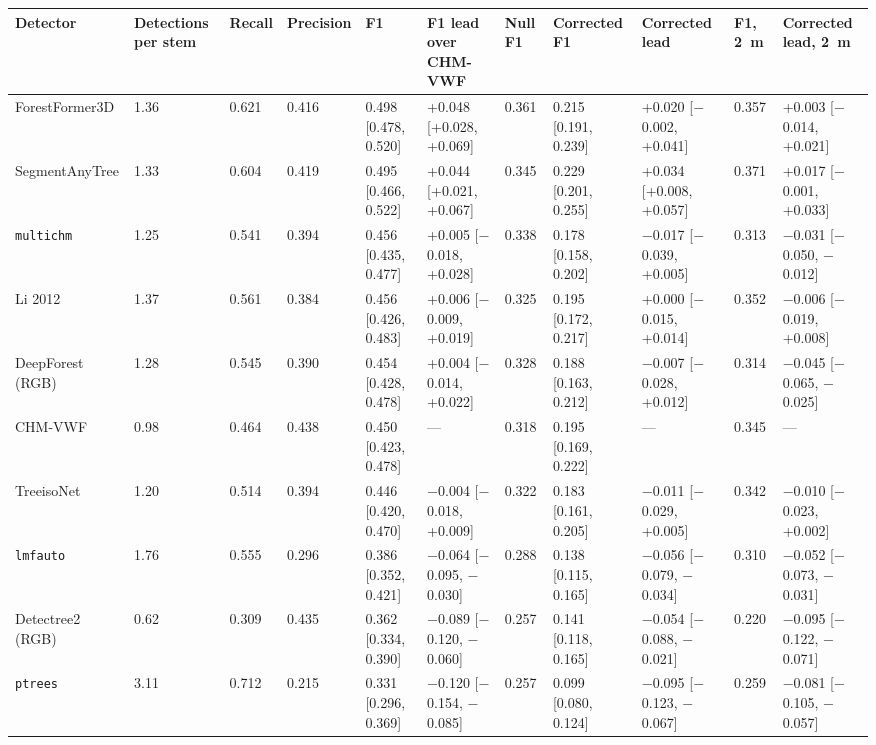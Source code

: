 \documentclass[preprint,12pt,authoryear,a4paper]{elsarticle}
\begin{document}
\begin{table}
\centering
{\footnotesize
\setlength{\tabcolsep}{3pt}
\renewcommand{\arraystretch}{1.15}
\begin{tabularx}{\linewidth}{LLllLLlLLlL}
\toprule
Detector & Detections per stem & Recall & Precision & F1 & F1 lead over CHM-VWF & Null F1 & Corrected F1 & Corrected lead & F1, 2~m & Corrected lead, 2~m \\
\midrule
ForestFormer3D & 1.36 & 0.621 & 0.416 & 0.498 [0.478, 0.520] & +0.048 [+0.028, +0.069] & 0.361 & 0.215 [0.191, 0.239] & +0.020 [$-$0.002, +0.041] & 0.357 & +0.003 [$-$0.014, +0.021] \\
SegmentAnyTree & 1.33 & 0.604 & 0.419 & 0.495 [0.466, 0.522] & +0.044 [+0.021, +0.067] & 0.345 & 0.229 [0.201, 0.255] & +0.034 [+0.008, +0.057] & 0.371 & +0.017 [$-$0.001, +0.033] \\
\texttt{multichm} & 1.25 & 0.541 & 0.394 & 0.456 [0.435, 0.477] & +0.005 [$-$0.018, +0.028] & 0.338 & 0.178 [0.158, 0.202] & $-$0.017 [$-$0.039, +0.005] & 0.313 & $-$0.031 [$-$0.050, $-$0.012] \\
Li 2012 & 1.37 & 0.561 & 0.384 & 0.456 [0.426, 0.483] & +0.006 [$-$0.009, +0.019] & 0.325 & 0.195 [0.172, 0.217] & +0.000 [$-$0.015, +0.014] & 0.352 & $-$0.006 [$-$0.019, +0.008] \\
DeepForest (RGB) & 1.28 & 0.545 & 0.390 & 0.454 [0.428, 0.478] & +0.004 [$-$0.014, +0.022] & 0.328 & 0.188 [0.163, 0.212] & $-$0.007 [$-$0.028, +0.012] & 0.314 & $-$0.045 [$-$0.065, $-$0.025] \\
CHM-VWF & 0.98 & 0.464 & 0.438 & 0.450 [0.423, 0.478] & --- & 0.318 & 0.195 [0.169, 0.222] & --- & 0.345 & --- \\
TreeisoNet & 1.20 & 0.514 & 0.394 & 0.446 [0.420, 0.470] & $-$0.004 [$-$0.018, +0.009] & 0.322 & 0.183 [0.161, 0.205] & $-$0.011 [$-$0.029, +0.005] & 0.342 & $-$0.010 [$-$0.023, +0.002] \\
\texttt{lmfauto} & 1.76 & 0.555 & 0.296 & 0.386 [0.352, 0.421] & $-$0.064 [$-$0.095, $-$0.030] & 0.288 & 0.138 [0.115, 0.165] & $-$0.056 [$-$0.079, $-$0.034] & 0.310 & $-$0.052 [$-$0.073, $-$0.031] \\
Detectree2 (RGB) & 0.62 & 0.309 & 0.435 & 0.362 [0.334, 0.390] & $-$0.089 [$-$0.120, $-$0.060] & 0.257 & 0.141 [0.118, 0.165] & $-$0.054 [$-$0.088, $-$0.021] & 0.220 & $-$0.095 [$-$0.122, $-$0.071] \\
\texttt{ptrees} & 3.11 & 0.712 & 0.215 & 0.331 [0.296, 0.369] & $-$0.120 [$-$0.154, $-$0.085] & 0.257 & 0.099 [0.080, 0.124] & $-$0.095 [$-$0.123, $-$0.067] & 0.259 & $-$0.081 [$-$0.105, $-$0.057] \\

\end{tabularx}}
\end{table}
\end{document}
